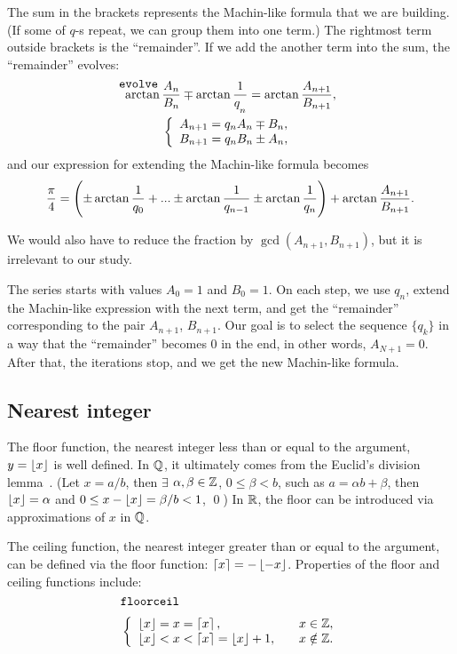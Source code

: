 \documentclass[draft, 11pt]{article} %
\begin{document}
The sum in the brackets represents the Machin-like formula that we are building.
(If some of $q$-s repeat, we can group them into one term.)
The rightmost term outside brackets is the ``remainder''. If we add the another term into the sum,
the ``remainder'' evolves:
%
\begin{equation}\mlabel{evolve}
\begin{array}{c}
\arctan\dfrac{A_n}{B_n} \mp \arctan\dfrac{1}{q_{n \strut}} = \arctan\dfrac{A_{n+1}}{B_{n+1}}, \\
\left\{\begin{array}{l}
A_{n+1} = q_n A_n \mp B_n, \strut \\
B_{n+1} = q_n B_n \pm A_n,
\end{array}\right.
\end{array}
\end{equation}
and our expression for extending the Machin-like formula becomes
$$
\dfrac{\pi}{4} =
    \left( \pm \arctan\dfrac{1}{q_0 \strut} + ... \pm \arctan\dfrac{1}{q_{n-1}}
        \pm \arctan\dfrac{1}{q_n} \right)
    + \arctan\dfrac{A_{n+1}}{B_{n+1}}.
$$

We would also have to reduce the fraction by $\gcd(A_{n+1}, B_{n+1})$,
but it is irrelevant to our study.

The series starts with values $A_0=1$ and $B_0=1$.
On each step, we use $q_n$, extend the Machin-like expression with the next term,
and get the ``remainder'' corresponding to the pair $A_{n+1}$, $B_{n+1}$.
Our goal is to select the sequence
$\{ q_k \}$ in a way that the ``remainder'' becomes $0$ in the end, in other words,
$A_{N+1}=0$. After that, the iterations stop, and we get the new Machin-like formula.

\subsection{Nearest integer}

The floor function, the nearest integer less than or equal to the argument,
$y=\nfloor{x}$ is well defined.
In $\Q$, it ultimately comes from the Euclid's division lemma~\cite{carmichael}.
(Let $x=a/b$, then $\exists$ $\alpha, \beta \in \Z$,
$0 \le \beta < b$, such as $a=\alpha b + \beta$, then $\nfloor{x} = \alpha$ and
$0 \le x - \nfloor{x} = \beta/b < 1$, \qed)
In $\R$, the floor can be introduced via approximations of $x$ in $\Q$.

The ceiling function, the nearest integer greater than or equal to the argument, can be defined
via the floor function: $\nceil{x} = -\nfloor{-x}$.
Properties of the floor and ceiling functions include:~\cite{knuth}
%
\begin{equation}\mlabel{floorceil}
\left\{\begin{array}{ll}
\nfloor{x} = x = \nceil{x}, & x \in \Z, \\
\nfloor{x} < x < \nceil{x} = \nfloor{x} + 1, \quad & x \notin \Z.
\end{array}\right.
\end{equation}
\end{document}

